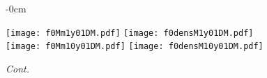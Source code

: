 \documentclass[universe,article,accept,moreauthors,pdftex]{Definitions/mdpi}
\begin{document}
\begin{figure}[H]

\begin{adjustwidth}{-\extralength}{0cm}
\centering %

{\texttt{[image: f0Mm1y01DM.pdf]}\vspace{3pt}
	  \texttt{[image: f0densM1y01DM.pdf]}}\\\vspace{5pt}
{\texttt{[image: f0Mm10y01DM.pdf]}\vspace{3pt}
	  \texttt{[image: f0densM10y01DM.pdf]}}\\
\end{adjustwidth}
\caption{\emph{Cont.}}
\label{fig:f0Mdens01DM}

\end{figure}
\end{document}

